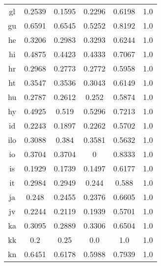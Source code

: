 \begin{figure}[h]
\begin{tabular}{cccccc}
gl&0.2539&0.1595&0.2296&0.6198&1.0\\
gu&0.6591&0.6545&0.5252&0.8192&1.0\\
he&0.3206&0.2983&0.3293&0.6244&1.0\\
hi&0.4875&0.4423&0.4333&0.7067&1.0\\
hr&0.2968&0.2773&0.2772&0.5958&1.0\\
ht&0.3547&0.3536&0.3043&0.6149&1.0\\
hu&0.2787&0.2612&0.252&0.5874&1.0\\
hy&0.4925&0.519&0.5296&0.7213&1.0\\
id&0.2243&0.1897&0.2262&0.5702&1.0\\
ilo&0.3088&0.384&0.3581&0.5632&1.0\\
io&0.3704&0.3704&0&0.8333&1.0\\
is&0.1929&0.1739&0.1497&0.6177&1.0\\
it&0.2984&0.2949&0.244&0.588&1.0\\
ja&0.248&0.2455&0.2376&0.6605&1.0\\
jv&0.2244&0.2119&0.1939&0.5701&1.0\\
ka&0.3095&0.2889&0.3306&0.6504&1.0\\
kk&0.2&0.25&0.0&1.0&1.0\\
kn&0.6451&0.6178&0.5988&0.7939&1.0\\
\end{tabular}
\end{figure}
\clearpage
